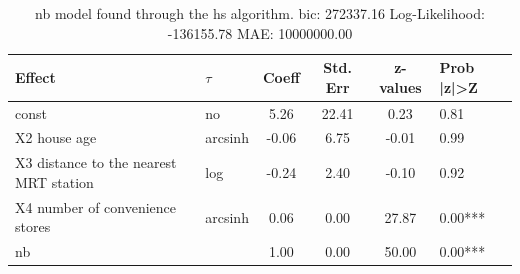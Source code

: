 \begin{table}
	\caption{nb model found through the hs algorithm. bic: 272337.16 Log-Likelihood: -136155.78 MAE: 10000000.00}
	\begin{center}
		\begin{tabular}{|l|l|c|c|c|l|}
			\hline
			Effect & $\tau$ & Coeff & Std. Err & z-values & Prob |z|>Z \\
			\hline
			const & no & 5.26 & 22.41 & 0.23 & 0.81 \\
			\hline
			X2 house age & arcsinh & -0.06 & 6.75 & -0.01 & 0.99 \\
			\hline
			X3 distance to the nearest MRT station & log & -0.24 & 2.40 & -0.10 & 0.92 \\
			\hline
			X4 number of convenience stores & arcsinh & 0.06 & 0.00 & 27.87 & 0.00*** \\
			\hline
			nb &  & 1.00 & 0.00 & 50.00 & 0.00*** \\
			\hline
		\end{tabular}
	\end{center}
\end{table}